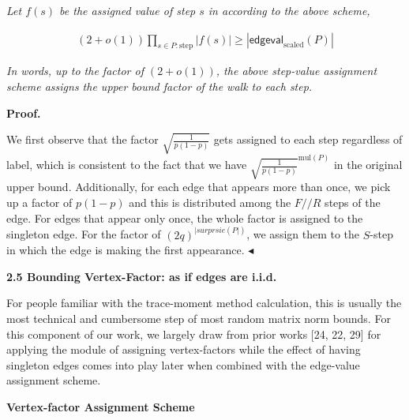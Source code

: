 \documentclass[10pt,a4paper]{article}
\begin{document}
\emph{Let $f(s)$ be the assigned value of step $s$ in according to the above scheme,}\par


\[\begin{gathered}
(2+o(1))\prod_{s\in P:\text{step}}|f(s)|\geq|\mathsf{edgeval}_{\text{scaled}}(P)|
\end{gathered}\]


\emph{In words, up to the factor of $(2+o(1))$, the above step-value assignment scheme assigns the upper bound factor of the walk to each step.}\par






\par\medskip\noindent\textbf{Proof.}\par




We first observe that the factor $\sqrt{\frac{1}{p(1-p)}}$ gets assigned to each step regardless of label, which is consistent to the fact that we have $\sqrt{\frac{1}{p(1-p)}}^{\text{mul}(P)}$ in the original upper bound. Additionally, for each edge that appears more than once, we pick up a factor of $p(1-p)$ and this is distributed among the $F//R$ steps of the edge. For edges that appear only once, the whole factor is assigned to the singleton edge. For the factor of $(2q)^{|surprsie(P|)}$, we assign them to the $S$-step in which the edge is making the first appearance. $\blacktriangleleft$\par






\par\medskip\noindent\textbf{
2.5 Bounding Vertex-Factor: as if edges are i.i.d.}\par




For people familiar with the trace-moment method calculation, this is usually the most technical and cumbersome step of most random matrix norm bounds. For this component of our work, we largely draw from prior works [24, 22, 29] for applying the module of assigning vertex-factors while the effect of having singleton edges comes into play later when combined with the edge-value assignment scheme.\par




\par\medskip\noindent\textbf{Vertex-factor Assignment Scheme}\par
\end{document}
